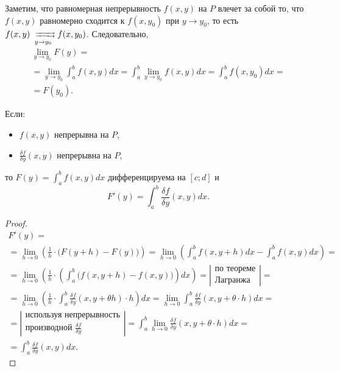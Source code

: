 \begin{remark}
    Заметим, что равномерная непрерывность $f(x,y)$ на $P$ влечет за собой то, что $f(x,y)$ равномерно сходится к $f(x,y_0)$ при $y \rightarrow y_0$, то есть $f(x,y) \xrightrightarrows[y \rightarrow y_0]{} f(x,y_0)$. Следовательно,
    \begin{multline*}
        \underset{y\rightarrow y_0}{\lim}F(y) = \\
        = \underset{y\rightarrow y_0}{\lim}\int_{a}^{b}f(x,y)dx = \int_{a}^{b}\underset{y \rightarrow y_0}{\lim}f(x,y)dx = \int_{a}^{b}f(x,y_0)dx = \\
        = F(y_0).
    \end{multline*}
\end{remark}

\begin{lemma}\label{lemma:7.1.1}
    Если:
    \begin{itemize}
        \item $f(x,y)$ непрерывна на $P$,
        \item $\frac{\delta f}{\delta y}(x,y)$ непрерывна на $P$,
    \end{itemize}
    то $F(y) = \int_{a}^{b}f(x,y)dx$ дифференцируема на $[c;d]$ и
    \[
        F'(y) = \int_{a}^{b}\frac{\delta f}{\delta y}(x,y)dx.
    \]
\end{lemma}

\begin{proof}
    \begin{multline*}
        F'(y) = \\
        = \underset{h\rightarrow 0}{\lim}\left(\frac{1}{h} \cdot \big(F(y+h) - F(y)\big)\right) =\underset{h\rightarrow0}{\lim}\left(\int_{a}^{b}f(x,y+h)dx - \int_{a}^{b}f(x,y)dx\right) = \\
        =\underset{h\rightarrow0}{\lim}\left(\frac{1}{h}\cdot \left(\int_{a}^{b}\big(f(x,y+h) - f(x,y)\big)\right)dx\right) = \left|\begin{array}{c}
            \text{по теореме} \\
            \text{Лагранжа}
        \end{array}\right| = \\
        = \underset{h\rightarrow0}{\lim}\left(\frac{1}{h}\cdot \int_{a}^{b}\frac{\delta f}{\delta y}(x,y+\theta h) \cdot h\right)dx = \underset{h\rightarrow 0}{\lim}\int_{a}^{b}\frac{\delta f}{\delta y}(x,y + \theta \cdot h)dx = \\
        = \left|\begin{array}{c}
            \text{используя непрерывность} \\
            \text{производной } \frac{\delta f}{\delta y}
        \end{array}\right| =\int_{a}^{b}\underset{h\rightarrow 0}{\lim}\frac{\delta f}{\delta y}(x,y+\theta\cdot h)dx = \\
        = \int_{a}^{b}\frac{\delta f}{\delta y}(x,y)dx.
    \end{multline*}
\end{proof}

